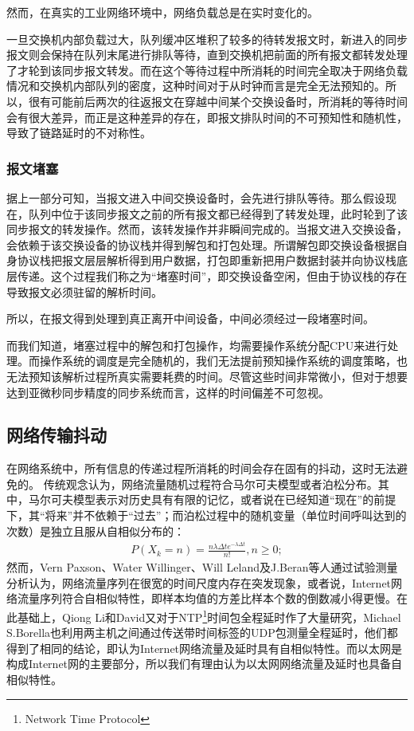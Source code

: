 然而，在真实的工业网络环境中，网络负载总是在实时变化的。

一旦交换机内部负载过大，队列缓冲区堆积了较多的待转发报文时，新进入的同步报文则会保持在队列末尾进行排队等待，直到交换机把前面的所有报文都转发处理了才轮到该同步报文转发。而在这个等待过程中所消耗的时间完全取决于网络负载情况和交换机内部队列的密度，这种时间对于从时钟而言是完全无法预知的。所以，很有可能前后两次的往返报文在穿越中间某个交换设备时，所消耗的等待时间会有很大差异，而正是这种差异的存在，即报文排队时间的不可预知性和随机性，导致了链路延时的不对称性。

\subsubsection{报文堵塞}
据上一部分可知，当报文进入中间交换设备时，会先进行排队等待。那么假设现在，队列中位于该同步报文之前的所有报文都已经得到了转发处理，此时轮到了该同步报文的转发操作。然而，该转发操作并非瞬间完成的。当报文进入交换设备，会依赖于该交换设备的协议栈并得到解包和打包处理。所谓解包即交换设备根据自身协议栈把报文层层解析得到用户数据，打包即重新把用户数据封装并向协议栈底层传递。这个过程我们称之为“堵塞时间”，即交换设备空闲，但由于协议栈的存在导致报文必须驻留的解析时间。

所以，在报文得到处理到真正离开中间设备，中间必须经过一段堵塞时间。

而我们知道，堵塞过程中的解包和打包操作，均需要操作系统分配CPU来进行处理。而操作系统的调度是完全随机的，我们无法提前预知操作系统的调度策略，也无法预知该解析过程所真实需要耗费的时间。尽管这些时间非常微小，但对于想要达到亚微秒同步精度的同步系统而言，这样的时间偏差不可忽视。

\subsection{网络传输抖动}
在网络系统中，所有信息的传递过程所消耗的时间会存在固有的抖动，这时无法避免的。
传统观念认为，网络流量随机过程符合马尔可夫模型或者泊松分布。其中，马尔可夫模型表示对历史具有有限的记忆，或者说在已经知道“现在”的前提下，其“将来”并不依赖于“过去”；而泊松过程中的随机变量（单位时间呼叫达到的次数）是独立且服从自相似分布的：
\begin {align}
P(X_{k} = n) = \frac{n\lambda\Delta t e^{- \lambda\Delta t}}{n!},n\geq 0;
\end{align}
然而，Vern Paxson\supercite{13}、Water Willinger\supercite{14}、Will Leland\supercite{15}及J.Beran\supercite{16}等人通过试验测量分析认为，网络流量序列在很宽的时间尺度内存在突发现象，或者说，Internet网络流量序列符合自相似特性，即样本均值的方差比样本个数的倒数减小得更慢。在此基础上，Qiong Li和David\supercite{17}又对于NTP\footnote{Network Time Protocol}时间包全程延时作了大量研究，Michael S.Borella\supercite{18}也利用两主机之间通过传送带时间标签的UDP包测量全程延时，他们都得到了相同的结论，即认为Internet网络流量及延时具有自相似特性。而以太网是构成Internet网的主要部分，所以我们有理由认为以太网网络流量及延时也具备自相似特性。

